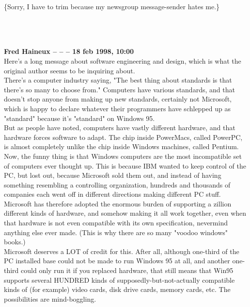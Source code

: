 \documentclass[11pt,twoside,a4paper]{article}
\begin{document}
\begin{multicols*}{2}
\{Sorry, I have to trim because my newsgroup message-sender hates me.\}

	
	
		
~\\ ~\\ ~\\ \textbf{Fred Haineux -- -- -- 18 feb 1998, 10:00}~\\
		
Here's a long message about software engineering and design, which is what the original author seems to be inquiring about.~\\

There's a computer industry saying, "The best thing about standards is that there's so many to choose from." Computers have various standards, and that doesn't stop anyone from making up new standards, certainly not Microsoft, which is happy to declare whatever their programmers have schlepped up as "standard" because it's "standard" on Windows 95.~\\

But as people have noted, computers have vastly different hardware, and that hardware forces software to adapt. The chip inside PowerMacs, called PowerPC, is almost completely unlike the chip inside Windows machines, called Pentium.~\\

Now, the funny thing is that Windows computers are the most incompatible set of computers ever thought up. This is because IBM wanted to keep control of the PC, but lost out, because Microsoft sold them out, and instead of having something resembling a controlling organization, hundreds and thousands of companies each went off in different directions making different PC stuff.~\\

Microsoft has therefore adopted the enormous burden of supporting a zillion different kinds of hardware, and somehow making it all work together, even when that hardware is not even compatible with its own specification, nevermind anything else ever made. (This is why there are so many "voodoo windows" books.)~\\

Microsoft deserves a LOT of credit for this. After all, although one-third of the PC installed base could not be made to run Windows 95 at all, and another one-third could only run it if you replaced hardware, that still means that Win95 supports several HUNDRED kinds of supposedly-but-not-actually compatible kinds of (for example) video cards, disk drive cards, memory cards, etc. The possibilities are mind-boggling.~\\


\end{multicols*}
\end{document}
